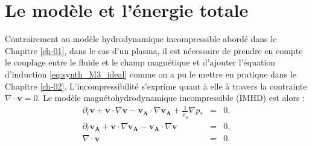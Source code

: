 \section{Le modèle et l'énergie totale}
\label{sec-111}
Contrairement au modèle hydrodynamique incompressible abordé dans le Chapitre \ref{ch-01}, dans le cas d'un plasma, il est nécessaire de prendre en compte le couplage entre le fluide et le champ magnétique et d'ajouter l'équation d'induction \eqref{eq:synth_M3_ideal} comme on a pu le mettre en pratique dans le Chapitre \ref{ch-02}. L'incompressibilité s'exprime quant à elle à travers la contrainte $\nabla \cdot \boldsymbol{v} = 0$. Le modèle magnétohydrodynamique incompressible (\acs{IMHD}) est alors :
\begin{eqnarray}
\label{eq:model_inc_v} \partial_t \boldsymbol{v} + \boldsymbol{v} \cdot \nabla \boldsymbol{v} -  \boldsymbol{v_A} \cdot \nabla \boldsymbol{v_A} + \frac{1}{\rho_0} \nabla p_* &=& 0, \\
\label{eq:model_inc_b} \partial_t \boldsymbol{v_A} + \boldsymbol{v} \cdot \nabla \boldsymbol{v_A} -  \boldsymbol{v_A} \cdot \nabla \boldsymbol{v}&=& 0, \\
\label{eq:model_inc_r} \nabla \cdot \boldsymbol{v} &=& 0.
\end{eqnarray}
